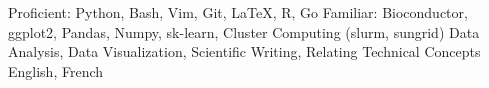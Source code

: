\begin{cvskills}
    	    {Proficient: Python, Bash, Vim, Git, LaTeX, R, Go}
	\cvskill{}
            {Familiar: Bioconductor, ggplot2, Pandas, Numpy, sk-learn, Cluster Computing (slurm, sungrid)}
            {Data Analysis, Data Visualization, Scientific Writing, Relating Technical Concepts}
		    {English, French}
\end{cvskills}
